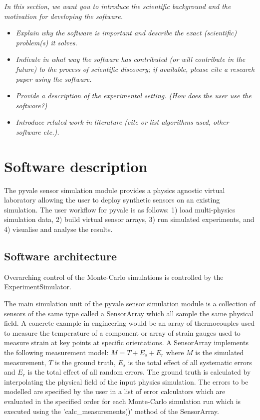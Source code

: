 \documentclass[11pt, a4paper, oneside, onecolumn]{article}
\begin{document}
\textit{In this section, we want you to introduce the scientific background and the motivation for developing the software.}

\begin{itemize}
    \item \textit{Explain why the software is important and describe the exact (scientific) problem(s) it solves.}
    \item \textit{Indicate in what way the software has contributed (or will contribute in the future) to the process of scientific discovery; if available, please cite a research paper using the software.}
    \item \textit{Provide a description of the experimental setting. (How does the user use the software?)}
    \item \textit{Introduce related work in literature (cite or list algorithms used, other software etc.).}
\end{itemize}

\section{Software description}
The pyvale sensor simulation module provides a physics agnostic virtual laboratory allowing the user to deploy synthetic sensors on an existing simulation. The user workflow for pyvale is as follows: 1) load multi-physics simulation data, 2) build virtual sensor arrays, 3) run simulated experiments, and 4) visualise and analyse the results.

\subsection{Software architecture}
Overarching control of the Monte-Carlo simulations is controlled by the ExperimentSimulator. 

The main simulation unit of the pyvale sensor simulation module is a collection of sensors of the same type called a SensorArray which all sample the same physical field. A concrete example in engineering would be an array of thermocouples used to measure the temperature of a component or array of strain gauges used to measure strain at key points at specific orientations. A SensorArray implements the following measurement model: $M = T + E_{s} + E_{r}$ where $M$ is the simulated measurement, $T$ is the ground truth, $E_{s}$ is the total effect of all systematic errors and $E_{r}$ is the total effect of all random errors. The ground truth is calculated by interpolating the physical field of the input physics simulation. The errors to be modelled are specified by the user in a list of error calculators which are evaluated in the specified order for each Monte-Carlo simulation run which is executed using the 'calc_measurements()' method of the SensorArray.
\end{document}
